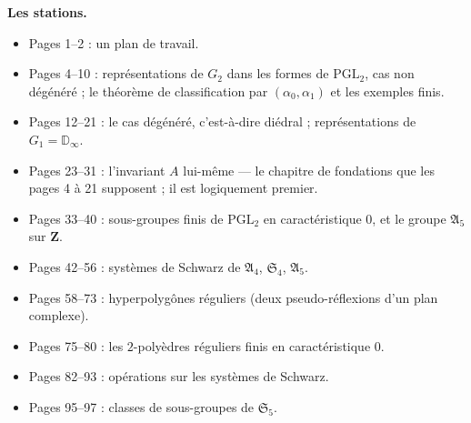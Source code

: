 \documentclass[11pt,a4paper]{article}
\begin{document}
\textbf{Les stations.}
\begin{itemize}
  \item Pages 1--2 : un plan de travail.
  \item Pages 4--10 : représentations de $G_2$ dans les formes de
    $\mathrm{PGL}_2$, cas non dégénéré ; le théorème de classification par
    $(\alpha_0, \alpha_1)$ et les exemples finis.
  \item Pages 12--21 : le cas dégénéré, c'est-à-dire diédral ; représentations
    de $G_1 = \mathbb{D}_\infty$.
  \item Pages 23--31 : l'invariant $A$ lui-même --- le chapitre de fondations
    que les pages 4 à 21 supposent ; il est logiquement premier.
  \item Pages 33--40 : sous-groupes finis de $\mathrm{PGL}_2$ en
    caractéristique $0$, et le groupe $\mathfrak{A}_5$ sur $\mathbf{Z}$.
  \item Pages 42--56 : systèmes de Schwarz de $\mathfrak{A}_4$,
    $\mathfrak{S}_4$, $\mathfrak{A}_5$.
  \item Pages 58--73 : hyperpolygônes réguliers (deux pseudo-réflexions d'un
    plan complexe).
  \item Pages 75--80 : les $2$-polyèdres réguliers finis en caractéristique
    $0$.
  \item Pages 82--93 : opérations sur les systèmes de Schwarz.
  \item Pages 95--97 : classes de sous-groupes de $\mathfrak{S}_5$.
\end{itemize}
\end{document}
